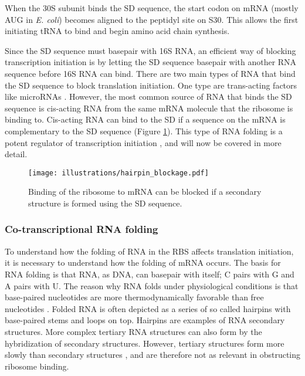 When the 30S subunit binds the SD sequence, the start codon on mRNA (mostly AUG
in \textit{E. coli}) becomes aligned to the peptidyl site on S30. This allows
the first initiating tRNA to bind and begin amino acid chain synthesis.

Since the SD sequence must basepair with 16S RNA, an efficient way of blocking
transcription initiation is by letting the SD sequence basepair with another
RNA sequence before 16S RNA can bind. There are two main types of RNA that bind
the SD sequence to block translation initiation. One type are trans-acting
factors like microRNAs \cite{storz_controlling_2004}. However, the most common
source of RNA that binds the SD sequence is cis-acting RNA from the same mRNA
molecule that the ribosome is binding to. Cis-acting RNA can bind to the SD if
a sequence on the mRNA is complementary to the SD sequence (Figure
\ref{fig:hairpin_blockage}). This type of RNA folding is a potent regulator of
transcription initiation \cite{hall_role_1982, de_smit_secondary_1990}, and
will now be covered in more detail.

\begin{figure}[h]
	\begin{center}
		\texttt{[image: illustrations/hairpin\_blockage.pdf]}
	\end{center}
	\caption{Binding of the ribosome to mRNA can be blocked if a secondary
	structure is formed using the SD sequence.}
	\label{fig:hairpin_blockage}
\end{figure}

\subsubsection{Co-transcriptional RNA folding}
To understand how the folding of RNA in the RBS affects translation initiation,
it is necessary to understand how the folding of mRNA occurs. The basis for RNA
folding is that RNA, as DNA, can basepair with itself; C pairs with G and A
pairs with U. The reason why RNA folds under physiological conditions is that
base-paired nucleotides are more thermodynamically favorable than free
nucleotides \cite{onoa_rna_2004}. Folded RNA is often depicted as a series of
so called hairpins with base-paired stems and loops on top. Hairpins are
examples of RNA secondary structures. More complex tertiary RNA structures can
also form by the hybridization of secondary structures. However, tertiary
structures form more slowly than secondary structures \cite{onoa_rna_2004}, and
are therefore not as relevant in obstructing ribosome binding.

